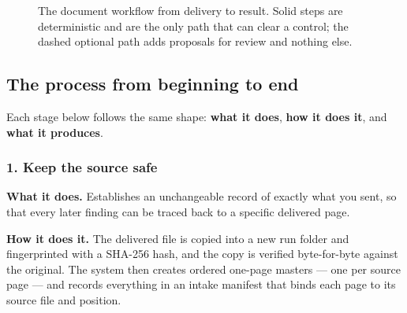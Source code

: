 \documentclass[
]{article}
\begin{document}
\begin{figure}[htbp]
{
}
\caption{The document workflow from delivery to result. Solid steps are deterministic and are the only path that can clear a control; the dashed optional path adds proposals for review and nothing else.}
\end{figure}

\subsection{The process from beginning to
end}\label{the-process-from-beginning-to-end}

Each stage below follows the same shape: \textbf{what it does},
\textbf{how it does it}, and \textbf{what it produces}.

\subsubsection{1. Keep the source safe}\label{keep-the-source-safe}

\textbf{What it does.} Establishes an unchangeable record of exactly
what you sent, so that every later finding can be traced back to a
specific delivered page.

\textbf{How it does it.} The delivered file is copied into a new run
folder and fingerprinted with a SHA-256 hash, and the copy is verified
byte-for-byte against the original. The system then creates ordered
one-page masters --- one per source page --- and records everything in
an intake manifest that binds each page to its source file and position.
\end{document}
